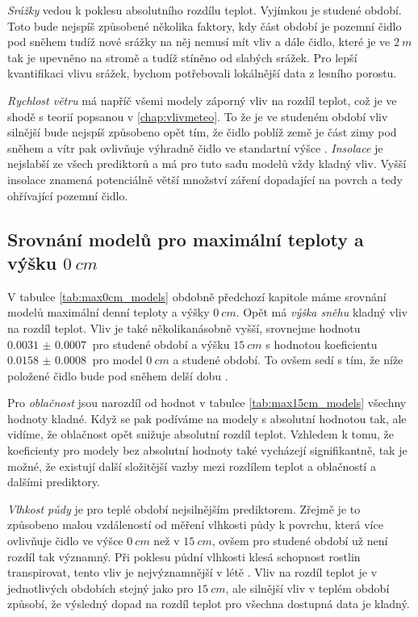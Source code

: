 \textit{Srážky} vedou k poklesu absolutního rozdílu teplot. Vyjímkou je studené období. Toto bude nejspíš způsobené několika faktory, kdy část období je pozemní čidlo pod sněhem tudíž nové srážky na něj nemusí mít vliv a dále čidlo, které je ve $\SI{2}{m}$ tak je upevněno na stromě a tudíž stíněno od slabých srážek. Pro lepší kvantifikaci vlivu srážek, bychom potřebovali lokálnější data z lesního porostu.

\textit{Rychlost větru} má napříč všemi modely záporný vliv na rozdíl teplot, což je ve shodě s teorií popsanou v \ref{chap:vlivmeteo}. To že je ve studeném období vliv silnější bude nejspíš způsobeno opět tím, že čidlo poblíž země je část zimy pod sněhem a vítr pak ovlivňuje výhradně čidlo ve standartní výšce \parencite{wind_contrastingmicroclimates}. \textit{Insolace} je nejslabší ze všech prediktorů a má pro tuto sadu modelů vždy kladný vliv. Vyšší insolace znamená potenciálně větší množství záření dopadající na povrch a tedy ohřívající pozemní čidlo.

\subsection{Srovnání modelů pro maximální teploty a výšku $\SI{0}{cm}$}
V tabulce \ref{tab:max0cm_models} obdobně předchozí kapitole máme srovnání modelů maximální denní teploty a výšky $\SI{0}{cm}$. Opět má \textit{výška sněhu} kladný vliv na rozdíl teplot. Vliv je také několikanásobně vyšší, srovnejme hodnotu $\SI{0.0031(7)}{}$ pro studené období a výšku $\SI{15}{cm}$ s hodnotou koeficientu $\SI{0.0158(8)}{}$ pro model $\SI{0}{cm}$ a studené období. To ovšem sedí s tím, že níže položené čidlo bude pod sněhem delší dobu \parencite{snow_deFrenneForestMicroclimates}.

Pro \textit{oblačnost} jsou narozdíl od hodnot v tabulce \ref{tab:max15cm_models} všechny hodnoty kladné. Když se pak podíváme na modely s absolutní hodnotou tak, ale vidíme, že oblačnost opět snižuje absolutní rozdíl teplot. Vzhledem k tomu, že koeficienty pro modely bez absolutní hodnoty také vycházejí signifikantně, tak je možné, že existují další složitější vazby mezi rozdílem teplot a oblačností a dalšími prediktory.

\textit{Vlhkost půdy} je pro teplé období nejsilnějším prediktorem. Zřejmě je to způsobeno malou vzdáleností od měření vlhkosti půdy k povrchu, která více ovlivňuje čidlo ve výšce $\SI{0}{cm}$ než v $\SI{15}{cm}$, ovšem pro studené období už není rozdíl tak významný. Při poklesu půdní vlhkosti klesá schopnost rostlin transpirovat, tento vliv je nejvýznamnější v létě \parencite{snow_deFrenneForestMicroclimates}. Vliv na rozdíl teplot je v jednotlivých obdobích stejný jako pro $\SI{15}{cm}$, ale silnější vliv v teplém období způsobí, že výsledný dopad na rozdíl teplot pro všechna dostupná data je kladný.

